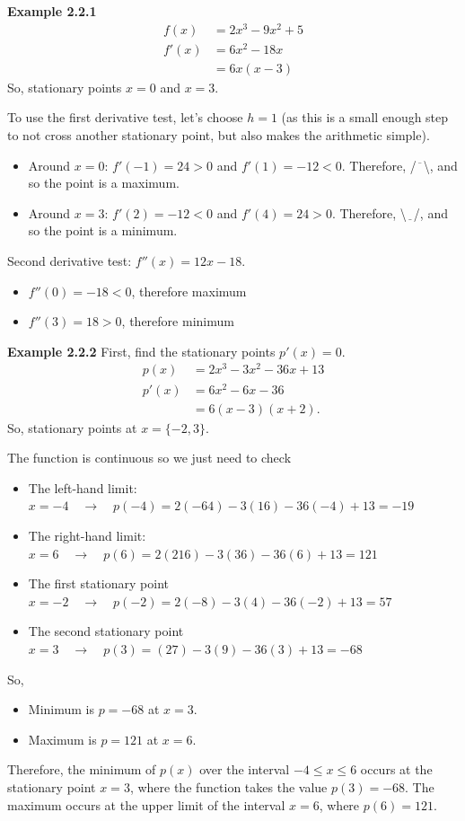 \vspace{10mm}
\textbf{Example 2.2.1}
\begin{align*}
f(x) &= 2x^3 - 9x^2 + 5 \\
f'(x) &= 6x^2 -18x\\
&= 6x(x-3)
\end{align*}
So, stationary points $x=0$ and $x=3$. 

To use the first derivative test, let's choose $h=1$ (as this is a small enough step to not cross another stationary point, but also makes the arithmetic simple).
\begin{itemize}
    \item Around $x = 0$: $f'(-1) = 24 > 0$ and $f'(1)=-12<0$. Therefore, /$\overline{\phantom{x}}$\textbackslash, and so the point is a maximum.
    \item Around $x = 3$: $f'(2) = -12 < 0$ and $f'(4)=24>0$. Therefore, \textbackslash$\underline{\phantom{x}}$/, and so the point is a minimum.
\end{itemize}
Second derivative test: $f''(x) = 12x - 18$. 
\begin{itemize}
    \item $f''(0) = -18 < 0$, therefore maximum\\
    \item $f''(3) = 18 > 0$, therefore minimum
\end{itemize}

\vspace{10mm}
\textbf{Example 2.2.2}
First, find the stationary points $p'(x) = 0$.
\begin{align*}
    p(x) &= 2x^3-3x^2-36x+13\\
    p'(x) &= 6x^2-6x-36\\
    &= 6(x-3)(x+2).
\end{align*}
So, stationary points at $x = \{-2,3\}$.

The function is continuous so we just need to check
\begin{itemize}
    \item The left-hand limit: $x=-4 \quad \rightarrow \quad p(-4) = 2(-64) - 3(16) - 36(-4) + 13 = -19$
    \item The right-hand limit: $x=6 \quad \rightarrow \quad p(6) = 2(216)-3(36)-36(6)+13 = 121$
    \item The first stationary point $x=-2 \quad \rightarrow \quad p(-2) = 2(-8) - 3(4) - 36(-2) + 13 = 57$
    \item The second stationary point $x=3 \quad \rightarrow \quad p(3) = (27)-3(9)-36(3)+13=-68$
\end{itemize}
So, 
\begin{itemize}
    \item Minimum is $p=-68$ at $x=3$.
    \item Maximum is $p = 121$ at $x=6$.
\end{itemize}
Therefore, the minimum of $p(x)$ over the interval $-4 \leq x \leq 6$ occurs at the stationary point $x=3$, where the function takes the value $p(3) = -68$. The maximum occurs at the upper limit of the interval $x=6$, where $p(6) = 121$.



